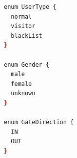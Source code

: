 \begin{minipage}{\textwidth}
\begin{lstlisting}[language=bash, caption={Definisi \textit{Enums} pada \texttt{schema.prisma}}, label={lst:prisma_enums}, frame=single, captionpos=t]
enum UserType {
  normal
  visitor
  blackList
}

enum Gender {
  male
  female
  unknown
}

enum GateDirection {
  IN
  OUT
}
\end{lstlisting}
\end{minipage}